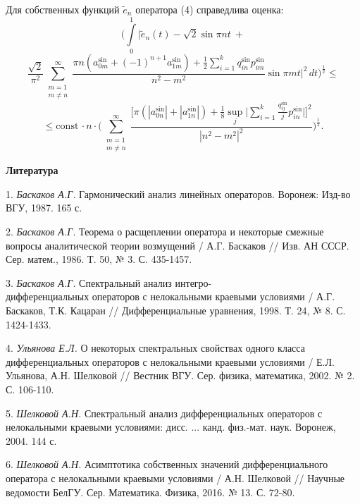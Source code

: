 {Для собственных функций $\widetilde{e}_n$ оператора (4) справедлива оценка:
$$
\bigg(\int\limits_0^1\bigg|\widetilde{e}_{n}(t)-\sqrt{2}\sin{\pi{nt}}~+
$$
$$\frac{\sqrt{2}}{\pi^2}\sum\limits_{\substack{m=1 \\ m\ne n}}^\infty \frac{\pi n(a_{0m}^{\sin} + (-1)^{n+1}a_{1m}^{\sin}) +
\frac{1}{2}\sum\limits_{i=1}^k q_{in}^{\sin}p_{im}^{\sin}}{n^2-m^2}\sin\pi mt\bigg|^2\,dt\bigg)^\frac{1}{2}\le
$$
$$
\le \mathrm{const}\,\cdot n\cdot\bigg(\sum\limits_{\substack{m=1 \\ m\ne n}}^\infty
\frac{\bigg[\pi(|a_{0n}^{\sin}| + |a_{1n}^{\sin}|) + \frac{1}{8}\sup\limits_j\bigg|
\sum\limits_{i=1}^k\frac{q_{ij}^{\sin}}{j}p_{in}^{\sin}\bigg|\bigg]^2}{|n^2-m^2|^2}\bigg)^\frac{1}{2}.
$$
}

\smallskip \centerline{\bf Литература}\nopagebreak

1. {\it Баскаков А.Г.} Гармонический анализ линейных операторов. Воронеж: Изд-во ВГУ, 1987. 165 с.

2. {\it Баскаков А.Г.} Теорема о расщеплении оператора и некоторые смежные вопросы аналитической теории возмущений / А.Г. Баскаков // Изв. АН СССР. Сер. матем., 1986. Т. 50, № 3. С. 435-1457.

3. {\it Баскаков А.Г.} Спектральный анализ интегро-\\дифференциальных операторов с нелокальными краевыми условиями / А.Г. Баскаков, Т.К. Кацаран // Дифференциальные уравнения, 1998. Т. 24, № 8. С. 1424-1433.

4. {\it Ульянова Е.Л.} О некоторых спектральных свойствах одного класса дифференциальных операторов с нелокальными краевыми условиями / Е.Л. Ульянова, А.Н. Шелковой // Вестник ВГУ. Сер. физика, математика, 2002. № 2. С. 106-110.

5. {\it Шелковой А.Н.} Спектральный анализ дифференциальных операторов с нелокальными краевыми условиями: дисс. ... канд. физ.-мат. наук. Воронеж, 2004. 144 с.

6. {\it Шелковой А.Н.} Асимптотика собственных значений дифференциального оператора с нелокальными краевыми условиями / А.Н. Шелковой // Научные ведомости БелГУ.
Сер. Математика. Физика, 2016. № 13. С. 72-80.

